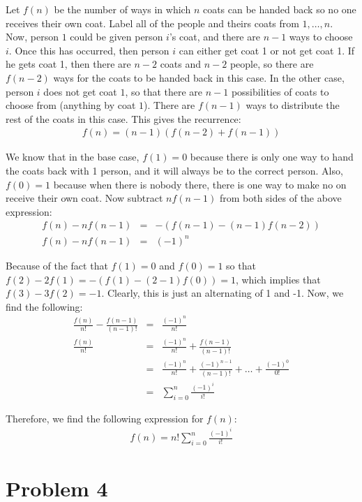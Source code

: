 \documentclass[psamsfonts]{amsart}
\newenvironment{sol}{{\bfseries Solution}}{\qedsymbol}
\theoremstyle{definition}
\theoremstyle{remark}
\numberwithin{equation}{section}
\begin{document}
\begin{sol}
Let $f(n)$ be the number of ways in which $n$ coats can be handed back so no one receives their own coat. Label all of the people and theirs coats from $1, \ldots, n$. Now, person $1$ could be given person $i$'s coat, and there are $n-1$ ways to choose $i$. Once this has occurred, then person $i$ can either get coat 1 or not get coat 1. If he gets coat 1, then there are $n-2$ coats and $n-2$ people, so there are $f(n-2)$ ways for the coats to be handed back in this case. In the other case, person $i$ does not get coat $1$, so that there are $n-1$ possibilities of coats to choose from (anything by coat $1$). There are $f(n-1)$ ways to distribute the rest of the coats in this case. This gives the recurrence:
\begin{eqnarray}
f(n) = (n-1)(f(n-2) + f(n-1))
\end{eqnarray}

We know that in the base case, $f(1) = 0$ because there is only one way to hand the coats back with 1 person, and it will always be to the correct person. Also, $f(0) = 1$ because when there is nobody there, there is one way to make no on receive their own coat. Now subtract $n f(n-1)$ from both sides of the above expression:
\begin{eqnarray}
f(n) - n f(n-1) &=& -( f(n-1) - (n-1) f(n-2)) \\ 
f(n) - n f(n-1) &=& (-1)^n
\end{eqnarray}

Because of the fact that $f(1) = 0$ and $f(0) = 1$ so that $f(2) - 2 f(1) = -(f(1) - (2-1)f(0)) = 1$, which implies that $f(3) - 3 f(2) = -1$. Clearly, this is just an alternating of 1 and -1. Now, we find the following:
\begin{eqnarray}
\frac{f(n)}{n!} - \frac{f(n-1)}{(n-1)!} &=& \frac{(-1)^n}{n!} \\
\frac{f(n)}{n!} &=& \frac{(-1)^n}{n!} + \frac{f(n-1)}{(n-1)!} \\
&=& \frac{(-1)^n}{n!} + \frac{(-1)^{n-1}}{(n-1)!} + \ldots + \frac{(-1)^0}{0!} \\
&=& \sum_{i=0}^n \frac{(-1)^i}{i!} 
\end{eqnarray}

Therefore, we find the following expression for $f(n)$:
\begin{eqnarray}
f(n) = n! \sum_{i=0}^n \frac{(-1)^i}{i!} 
\end{eqnarray}
\end{sol}

\section{Problem 4}
\end{document}
